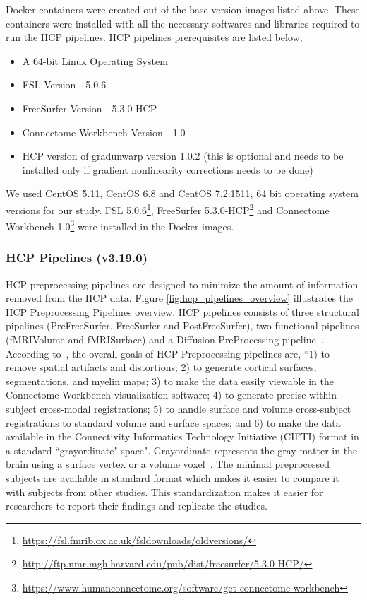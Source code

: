Docker containers were created out of the base version images listed above. These containers were installed with all the necessary softwares and libraries required to run the HCP pipelines. HCP pipelines prerequisites are listed below,

\begin{itemize}
 \item A 64-bit Linux Operating System
 \item FSL Version - 5.0.6
 \item FreeSurfer Version - 5.3.0-HCP
 \item Connectome Workbench Version - 1.0
 \item HCP version of gradunwarp version 1.0.2 (this is optional and needs to be installed only if gradient nonlinearity corrections needs to be done)
\end{itemize}

We used CentOS 5.11, CentOS 6.8 and CentOS 7.2.1511, 64 bit operating system versions for our study. FSL 5.0.6\footnote{\url{https://fsl.fmrib.ox.ac.uk/fsldownloads/oldversions/}}, FreeSurfer 5.3.0-HCP\footnote{\url{http://ftp.nmr.mgh.harvard.edu/pub/dist/freesurfer/5.3.0-HCP/}} and Connectome Workbench 1.0\footnote{\url{https://www.humanconnectome.org/software/get-connectome-workbench}} were installed in the Docker images.

\subsubsection{HCP Pipelines (v3.19.0)}
HCP preprocessing pipelines are designed to minimize the amount of information removed from the HCP data. Figure \ref{fig:hcp_pipelines_overview} illustrates the HCP Preprocessing Pipelines overview. HCP pipelines consists of three structural pipelines (PreFreeSurfer, FreeSurfer and PostFreeSurfer), two functional pipelines (fMRIVolume and fMRISurface) and a Diffusion PreProcessing pipeline~\cite{Gla13}. According to~\cite{Gla13}, the overall goals of HCP Preprocessing pipelines are, ``1) to remove spatial artifacts and distortions; 2) to generate cortical surfaces, segmentations, and myelin maps; 3) to make the data easily viewable in the Connectome Workbench visualization software; 4) to generate precise within-subject cross-modal registrations; 5) to handle surface and volume cross-subject registrations to standard volume and surface spaces; and 6) to make the data available in the Connectivity Informatics Technology Initiative (CIFTI) format in a standard ``grayordinate" space". Grayordinate represents the gray matter in the brain using a surface vertex or a volume voxel~\cite{Grayordinate}. The minimal preprocessed subjects are available in standard format which makes it easier to compare it with subjects from other studies. This standardization makes it easier for researchers to report their findings and replicate the studies.

